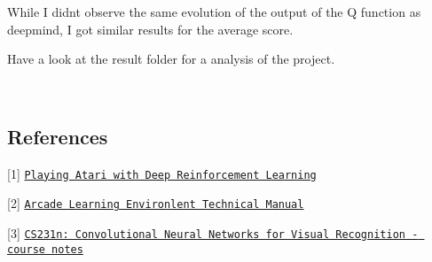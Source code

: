 While I didn\textquotesingle{}t observe the same evolution of the output of the Q function as deepmind, I got similar results for the average score.

Have a look at the result folder for a analysis of the project.

~ \subsection*{References}

\mbox{[}1\mbox{]} \href{https://arxiv.org/abs/1312.5602}{\tt Playing Atari with Deep Reinforcement Learning}

\mbox{[}2\mbox{]} \href{https://github.com/mgbellemare/Arcade-Learning-Environment/blob/master/doc/manual/manual.pdf}{\tt Arcade Learning Environlent Technical Manual}

\mbox{[}3\mbox{]} \href{http://cs231n.github.io/}{\tt C\+S231n\+: Convolutional Neural Networks for Visual Recognition -\/ course notes} 